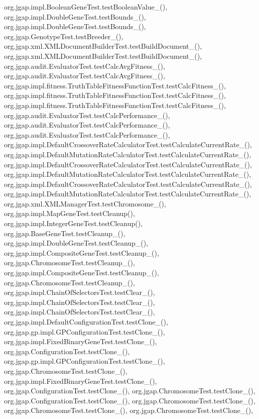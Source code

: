 org.\-jgap.\-impl.\-Boolean\-Gene\-Test.\-test\-Boolean\-Value\-\_(), org.\-jgap.\-impl.\-Double\-Gene\-Test.\-test\-Bounds\-\_(), org.\-jgap.\-impl.\-Double\-Gene\-Test.\-test\-Bounds\-\_(), org.\-jgap.\-Genotype\-Test.\-test\-Breeder\-\_(), org.\-jgap.\-xml.\-X\-M\-L\-Document\-Builder\-Test.\-test\-Build\-Document\-\_(), org.\-jgap.\-xml.\-X\-M\-L\-Document\-Builder\-Test.\-test\-Build\-Document\-\_(), org.\-jgap.\-audit.\-Evaluator\-Test.\-test\-Calc\-Avg\-Fitness\-\_(), org.\-jgap.\-audit.\-Evaluator\-Test.\-test\-Calc\-Avg\-Fitness\-\_(), org.\-jgap.\-impl.\-fitness.\-Truth\-Table\-Fitness\-Function\-Test.\-test\-Calc\-Fitness\-\_(), org.\-jgap.\-impl.\-fitness.\-Truth\-Table\-Fitness\-Function\-Test.\-test\-Calc\-Fitness\-\_(), org.\-jgap.\-impl.\-fitness.\-Truth\-Table\-Fitness\-Function\-Test.\-test\-Calc\-Fitness\-\_(), org.\-jgap.\-audit.\-Evaluator\-Test.\-test\-Calc\-Performance\-\_(), org.\-jgap.\-audit.\-Evaluator\-Test.\-test\-Calc\-Performance\-\_(), org.\-jgap.\-audit.\-Evaluator\-Test.\-test\-Calc\-Performance\-\_(), org.\-jgap.\-impl.\-Default\-Crossover\-Rate\-Calculator\-Test.\-test\-Calculate\-Current\-Rate\-\_(), org.\-jgap.\-impl.\-Default\-Mutation\-Rate\-Calculator\-Test.\-test\-Calculate\-Current\-Rate\-\_(), org.\-jgap.\-impl.\-Default\-Crossover\-Rate\-Calculator\-Test.\-test\-Calculate\-Current\-Rate\-\_(), org.\-jgap.\-impl.\-Default\-Mutation\-Rate\-Calculator\-Test.\-test\-Calculate\-Current\-Rate\-\_(), org.\-jgap.\-impl.\-Default\-Crossover\-Rate\-Calculator\-Test.\-test\-Calculate\-Current\-Rate\-\_(), org.\-jgap.\-impl.\-Default\-Mutation\-Rate\-Calculator\-Test.\-test\-Calculate\-Current\-Rate\-\_(), org.\-jgap.\-xml.\-X\-M\-L\-Manager\-Test.\-test\-Chromosome\-\_(), org.\-jgap.\-impl.\-Map\-Gene\-Test.\-test\-Cleanup(), org.\-jgap.\-impl.\-Integer\-Gene\-Test.\-test\-Cleanup(), org.\-jgap.\-Base\-Gene\-Test.\-test\-Cleanup\-\_(), org.\-jgap.\-impl.\-Double\-Gene\-Test.\-test\-Cleanup\-\_(), org.\-jgap.\-impl.\-Composite\-Gene\-Test.\-test\-Cleanup\-\_(), org.\-jgap.\-Chromosome\-Test.\-test\-Cleanup\-\_(), org.\-jgap.\-impl.\-Composite\-Gene\-Test.\-test\-Cleanup\-\_(), org.\-jgap.\-Chromosome\-Test.\-test\-Cleanup\-\_(), org.\-jgap.\-impl.\-Chain\-Of\-Selectors\-Test.\-test\-Clear\-\_(), org.\-jgap.\-impl.\-Chain\-Of\-Selectors\-Test.\-test\-Clear\-\_(), org.\-jgap.\-impl.\-Chain\-Of\-Selectors\-Test.\-test\-Clear\-\_(), org.\-jgap.\-impl.\-Default\-Configuration\-Test.\-test\-Clone\-\_(), org.\-jgap.\-gp.\-impl.\-G\-P\-Configuration\-Test.\-test\-Clone\-\_(), org.\-jgap.\-impl.\-Fixed\-Binary\-Gene\-Test.\-test\-Clone\-\_(), org.\-jgap.\-Configuration\-Test.\-test\-Clone\-\_(), org.\-jgap.\-gp.\-impl.\-G\-P\-Configuration\-Test.\-test\-Clone\-\_(), org.\-jgap.\-Chromosome\-Test.\-test\-Clone\-\_(), org.\-jgap.\-impl.\-Fixed\-Binary\-Gene\-Test.\-test\-Clone\-\_(), org.\-jgap.\-Configuration\-Test.\-test\-Clone\-\_(), org.\-jgap.\-Chromosome\-Test.\-test\-Clone\-\_(), org.\-jgap.\-Configuration\-Test.\-test\-Clone\-\_(), org.\-jgap.\-Chromosome\-Test.\-test\-Clone\-\_(), org.\-jgap.\-Chromosome\-Test.\-test\-Clone\-\_(), org.\-jgap.\-Chromosome\-Test.\-test\-Clone\-\_(), 